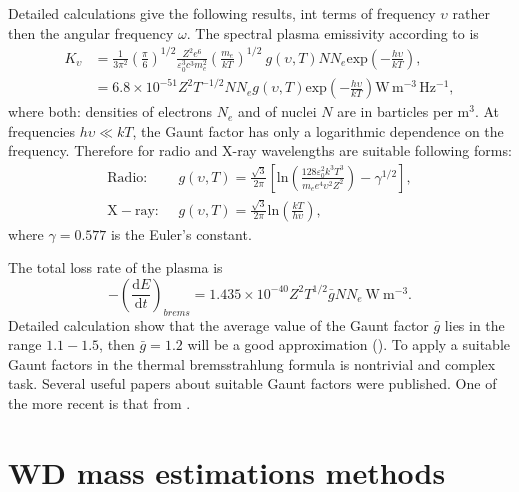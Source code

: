 \documentclass[oneside,a4paper,11pt]{report}
\begin{document}
Detailed calculations give the following results, int terms of frequency $\upsilon$ rather then the angular
frequency $\omega$. The spectral plasma emissivity according to \citet{longair:1} is
\begin{equation}
 \label{tbremss1}
\begin{split}
 K_\upsilon &= \frac{1}{3\pi^2}\left ( \frac{\pi}{6} \right )^{1/2} \frac{Z^2e^6}{\varepsilon^3_0c^3m_e^2} \left ( \frac{m_e}{kT} \right )^{1/2} \: g(\upsilon,T) N N_e \mathrm{exp}\left ( -\frac{h \upsilon}{kT} \right ), \\
 & = 6.8 \times 10^{-51} Z^2 T^{-1/2} N N_e g(\upsilon, T) \mathrm{exp}\left ( - \frac{h \upsilon}{kT} \right ) \mathrm{W\,m^{-3}\,Hz^{-1}},     
\end{split}
\end{equation}
where both: densities of electrons $N_e$ and of nuclei $N$ are in barticles per $\mathrm{m^3}$. At frequencies 
$h \upsilon \ll kT$, the Gaunt factor has only a logarithmic dependence on the frequency.  
Therefore for radio and X-ray wavelengths are suitable following forms:
\begin{equation}
 \label{approx_brem}
\begin{split}
 \mathrm{Radio:} & \: \:g(\upsilon, T) = \frac{\sqrt{3}}{2\pi}\left [ \mathrm{ln} \left ( \frac{128\varepsilon_0^2k^3T^3}{m_e e^4 \upsilon^2 Z^2} \right ) - \gamma^{1/2} \right ] ,\\
 \mathrm{X-ray:} & \: \:g(\upsilon, T) = \frac{\sqrt{3}}{2\pi} \mathrm{ln} \left ( \frac{kT}{h\upsilon} \right ),
\end{split}
\end{equation}
where $\gamma = 0.577$ is the Euler's constant. 

The total loss rate of the plasma is
\begin{equation}
 \label{thermbrems_f}
-\left ( \frac{\mathrm{d}E}{\mathrm{d}t} \right )_{brems} = 1.435 \times10^{-40}Z^2T^{1/2}\bar{g}N N_e \: \mathrm{W\:m^{-3}}.
\end{equation}
Detailed calculation show that the average value of the Gaunt factor $\bar{g}$ lies in the range 
$1.1 - 1.5$, then $\bar{g} = 1.2$ will be a good approximation (\citet{longair:1}).  
To apply a suitable Gaunt factors in the thermal bremsstrahlung formula is nontrivial and complex task.
Several useful papers about suitable Gaunt factors
 were published. One of the more recent is that from 
\citet{1998MNRAS.300..321S}.

\section{WD mass estimations methods}
\end{document}
